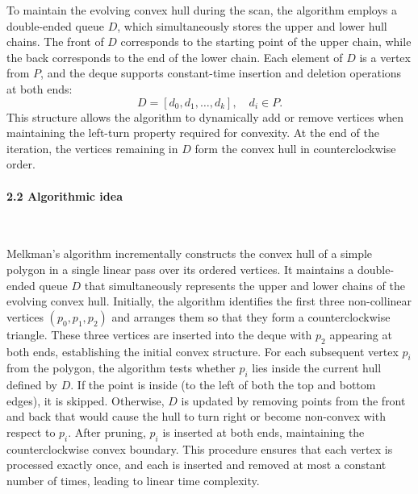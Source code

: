 \documentclass{article}
\begin{document}
To maintain the evolving convex hull during the scan, the algorithm employs a double-ended queue $D$, which simultaneously stores the upper and lower hull chains. 
The front of $D$ corresponds to the starting point of the upper chain, while the back corresponds to the end of the lower chain. 
Each element of $D$ is a vertex from $P$, and the deque supports constant-time insertion and deletion operations at both ends:
\[
D = [d_0, d_1, \dots, d_k], \quad d_i \in P.
\]
This structure allows the algorithm to dynamically add or remove vertices when maintaining the left-turn property required for convexity. 
At the end of the iteration, the vertices remaining in $D$ form the convex hull in counterclockwise order.

\paragraph{2.2 Algorithmic idea}\

Melkman’s algorithm incrementally constructs the convex hull of a simple polygon in a single linear pass over its ordered vertices. 
It maintains a double-ended queue $D$ that simultaneously represents the upper and lower chains of the evolving convex hull. 
Initially, the algorithm identifies the first three non-collinear vertices $(p_0, p_1, p_2)$ and arranges them so that they form a counterclockwise triangle. 
These three vertices are inserted into the deque with $p_2$ appearing at both ends, establishing the initial convex structure.
For each subsequent vertex $p_i$ from the polygon, the algorithm tests whether $p_i$ lies inside the current hull defined by $D$. 
If the point is inside (to the left of both the top and bottom edges), it is skipped. 
Otherwise, $D$ is updated by removing points from the front and back that would cause the hull to turn right or become non-convex with respect to $p_i$. 
After pruning, $p_i$ is inserted at both ends, maintaining the counterclockwise convex boundary. 
This procedure ensures that each vertex is processed exactly once, and each is inserted and removed at most a constant number of times, leading to linear time complexity.
\end{document}
